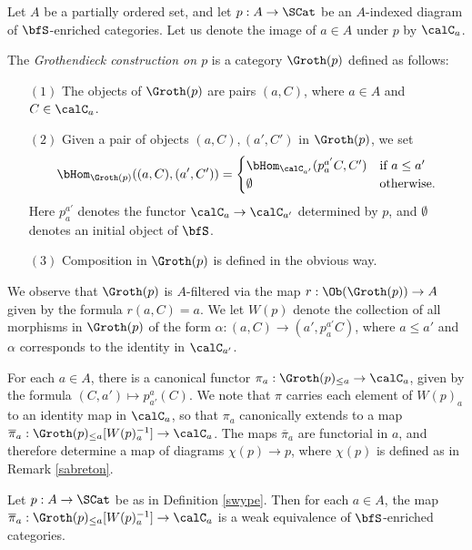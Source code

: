 \begin{definition}\label{swype}
Let $A$ be a partially ordered set, and let $p: A \rightarrow \SCat$ be an $A$-indexed diagram of $\bfS$-enriched categories. Let us denote the image of $a \in A$ under $p$ by $\calC_{a}$.

The {\it Grothendieck construction on $p$} is a category
$\Groth(p)$ defined as follows:
\begin{itemize}
\item[$(1)$] The objects of $\Groth(p)$ are pairs $(a, C)$, where $a \in A$ and
$C \in \calC_{a}$.
\item[$(2)$] Given a pair of objects $(a,C), (a', C')$ in $\Groth(p)$, we set
$$ \bHom_{ \Groth(p) }( (a,C), (a',C') ) = \begin{cases} \bHom_{\calC_{a'}}( p^{a'}_{a} C,
C') & \text{if } a \leq a' \\
\emptyset & \text{otherwise.} \end{cases}$$
Here $p^{a'}_{a}$ denotes the functor $\calC_{a} \rightarrow \calC_{a'}$ determined by
$p$, and $\emptyset$ denotes an initial object of $\bfS$.
\item[$(3)$] Composition in $\Groth(p)$ is defined in the obvious way.
\end{itemize}

We observe that $\Groth(p)$ is $A$-filtered via the map
$r: \Ob( \Groth(p) ) \rightarrow A$ given by the formula
$r(a,C) = a$. We let $W(p)$ denote the collection of all morphisms in
$\Groth(p)$ of the form $\alpha: (a, C) \rightarrow (a', p^{a'}_{a} C)$, where
$a \leq a'$ and $\alpha$ corresponds to the identity in $\calC_{a'}$. 

For each $a \in A$, there is a canonical functor
$\pi_{a}: \Groth(p)_{\leq a} \rightarrow \calC_{a}$, given by the formula
$(C, a') \mapsto p^{a}_{a'}(C)$. We note that $\pi$ carries
each element of $W(p)_{a}$ to an identity map in $\calC_{a}$, so that
$\pi_{a}$ canonically extends to a map $\overline{\pi}_{a}: \Groth(p)_{\leq a}[ W(p)_{a}^{-1}] \rightarrow \calC_{a}$. The maps $\overline{\pi}_{a}$ are functorial in
$a$, and therefore determine a map of diagrams $\chi(p) \rightarrow p$, where
$\chi(p)$ is defined as in Remark \ref{sabreton}.
\end{definition}

\begin{lemma}\label{cutta}
Let $p: A \rightarrow \SCat$ be as in Definition \ref{swype}. Then for each
$a \in A$, the map $\overline{\pi}_{a}: \Groth(p)_{\leq a}[ W(p)_{a}^{-1}] \rightarrow \calC_{a}$
is a weak equivalence of $\bfS$-enriched categories.
\end{lemma}


